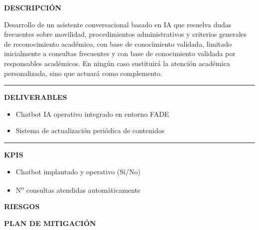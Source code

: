 \documentclass[11pt,a4paper]{scrreprt}
\newcommand{\fieldlabel}[1]{%
  {\footnotesize\sffamily\bfseries\color{mutedcolor}\MakeUppercase{#1}}\par\nopagebreak[4]
}
\newcommand{\fieldsep}{\vspace{3pt}\noindent\textcolor{bordercolor}{\rule{\linewidth}{0.4pt}}\vspace{3pt}\par}
\begin{document}
\begin{tcolorbox}[pabox={fgcolor}{PA1.2 \enspace\textbullet\enspace Elaboración de un chatbot con IA para estudiantes y propuesta de reglas de reconocimiento}]

\fieldlabel{Descripci\'on}
{\small Desarrollo de un asistente conversacional basado en IA que resuelva dudas frecuentes sobre movilidad, procedimientos administrativos y criterios generales de reconocimiento académico, con base de conocimiento validada, limitado inicialmente a consultas frecuentes y con base de conocimiento validada por responsables académicos. En ningún caso sustituirá la atención académica personalizada, sino que actuará como complemento. }\par
\fieldsep
\fieldlabel{Deliverables}
{\small \begin{itemize}[noitemsep,topsep=2pt]
\item Chatbot IA operativo integrado en entorno FADE
\item Sistema de actualización periódica de contenidos
\end{itemize}}\par
\fieldsep
\fieldlabel{KPIs}
{\small \begin{itemize}[noitemsep,topsep=2pt]
\item Chatbot implantado y operativo (Sí/No)
\item N\textsuperscript{o} consultas atendidas automáticamente
\end{itemize}}\par
\end{tcolorbox}
\begin{tcolorbox}[riskbox]
{\footnotesize\sffamily\bfseries\color{red!50!black} RIESGOS}\par{}
\end{tcolorbox}
\begin{tcolorbox}[mitbox]
{\footnotesize\sffamily\bfseries\color{green!40!black} PLAN DE MITIGACI\'ON}\par{}
\end{tcolorbox}
\vspace{8pt}
\end{document}

